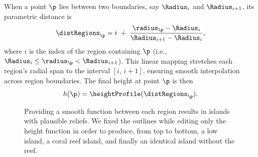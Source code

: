 When a point $\p$ lies between two boundaries, say $\Radius_{i}$ and $\Radius_{i+1}$, its parametric distance is
\begin{align}
    \distRegions_\p = i \;+\; \frac{\radius_\p - \Radius_{i}}{\Radius_{i + 1} - \Radius_{i}},
\end{align}
where $i$ is the index of the region containing $\p$ (i.e., $\Radius_i \le \radius_\p < \Radius_{i+1}$). This linear mapping stretches each region's radial span to the interval $[i,\,i+1]$, ensuring smooth interpolation across region boundaries. The final height at point $\p$ is then
\begin{align}
    h(\p) = \heightProfile(\distRegions_\p).
\end{align}




\begin{figure}
    \caption{Providing a smooth function between each region results in islands with plausible reliefs. We fixed the outlines while editing only the height function in order to produce, from top to bottom, a low island, a coral reef island, and finally an identical island without the reef. }
    \label{fig:coral-island_procedural-smooth-heights}
    \label{fig:coral-island_procedural-smooth-heights-multiple-examples}
\end{figure}





